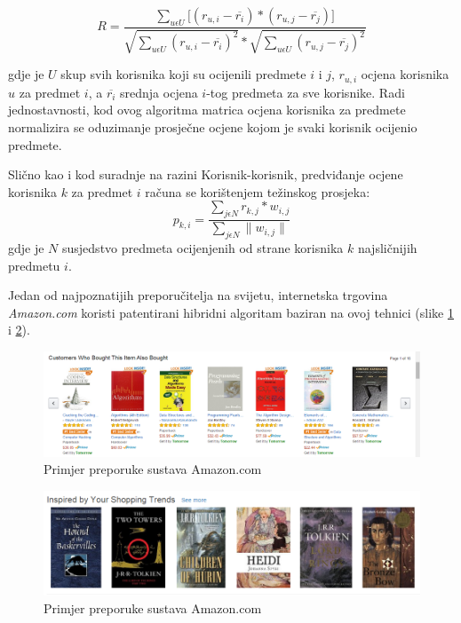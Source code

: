 \documentclass[times, utf8, diplomski, numeric]{fer}
\begin{document}
\begin{equation}
\label{eq:pearsonPredmet}
	R = \frac
			{\sum_{u \epsilon U} 
				\big[
					(r_{u,i} - \overline{r_i}) \ast
					(r_{u,j} - \overline{r_j})
				\big]
			}
			{
				\sqrt{{\sum_{u \epsilon U} (r_{u,i} - \overline{r_i})^2}} \ast 
				\sqrt{{\sum_{u \epsilon U} (r_{u,j} - \overline{r_j})^2}}
			}
\end{equation}

gdje je $U$ skup svih korisnika koji su ocijenili predmete $i$ i $j$, $r_{u,i}$
ocjena korisnika $u$ za predmet $i$, a $\overline{r_i}$ srednja ocjena $i$-tog
predmeta za sve korisnike. Radi jednostavnosti, kod ovog algoritma matrica
ocjena korisnika za predmete normalizira se oduzimanje prosječne ocjene
kojom je svaki korisnik ocijenio predmete. 

Slično kao i kod suradnje na razini Korisnik-korisnik, predviđanje ocjene
korisnika $k$ za predmet $i$ računa se korištenjem težinskog prosjeka:
\begin{equation}
\label{eq:tezinskiProsjek}
	p_{k,i} = 
		\frac
			{\sum_{j \epsilon N} r_{k,j} \ast w_{i,j}}
			{\sum_{j \epsilon N} \|w_{i,j}\|}
\end{equation}
gdje je $N$ susjedstvo predmeta ocijenjenih od strane korisnika $k$ najsličnijih
predmetu $i$.

Jedan od najpoznatijih preporučitelja na svijetu, internetska
trgovina \emph{Amazon.com} koristi patentirani hibridni algoritam baziran na
ovoj tehnici (slike \ref{fig:amazon1} i \ref{fig:amazon2}).
\begin{figure}[!htb]
	\centering
	\includegraphics[width=14.21cm]{images/collaborative/amazon.png}
	\caption{Primjer preporuke sustava \glqq Amazon.com\grqq}
	\label{fig:amazon1}
\end{figure}

\begin{figure}[!htb]
	\centering
	\includegraphics[width=14.21cm]{images/collaborative/amazon2.png}
	\caption{Primjer preporuke sustava \glqq Amazon.com\grqq}
	\label{fig:amazon2}
\end{figure}
\end{document}
